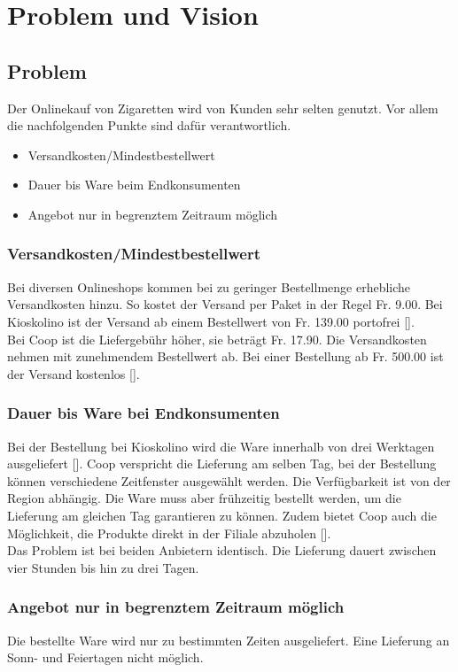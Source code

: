 \section{Problem und Vision}\label{Problem}
\subsection{Problem}
Der Onlinekauf von Zigaretten wird von Kunden sehr selten genutzt. Vor allem die nachfolgenden Punkte sind dafür verantwortlich. 
\begin{itemize}
	\item Versandkosten/Mindestbestellwert
	\item Dauer bis Ware beim Endkonsumenten
	\item Angebot nur in begrenztem Zeitraum möglich
\end{itemize}

\subsubsection{Versandkosten/Mindestbestellwert}
Bei diversen Onlineshops kommen bei zu geringer Bestellmenge erhebliche Versandkosten hinzu. So kostet der Versand per Paket in der Regel Fr. 9.00. Bei Kioskolino ist der Versand ab einem Bestellwert von Fr. 139.00 portofrei [\cite{kioskolino}]. 
\\Bei Coop ist die Liefergebühr höher, sie beträgt Fr. 17.90. Die Versandkosten nehmen mit zunehmendem Bestellwert ab. Bei einer Bestellung ab Fr. 500.00 ist der Versand kostenlos [\cite{coop}]. 
\subsubsection{Dauer bis Ware bei Endkonsumenten}
Bei der Bestellung bei Kioskolino wird die Ware innerhalb von drei Werktagen ausgeliefert [\cite{kioskolino}]. 
Coop verspricht die Lieferung am selben Tag, bei der Bestellung können verschiedene Zeitfenster ausgewählt werden. Die Verfügbarkeit ist von der Region abhängig. Die Ware muss aber frühzeitig bestellt werden, um die Lieferung am gleichen Tag garantieren zu können. Zudem bietet Coop auch die Möglichkeit, die Produkte direkt in der Filiale abzuholen [\cite{coop}].\\
Das Problem ist bei beiden Anbietern identisch. Die Lieferung dauert zwischen vier Stunden bis hin zu drei Tagen. 

\subsubsection{Angebot  nur in begrenztem Zeitraum möglich}
Die bestellte Ware wird nur zu bestimmten Zeiten ausgeliefert. Eine Lieferung an Sonn- und Feiertagen nicht möglich. 

